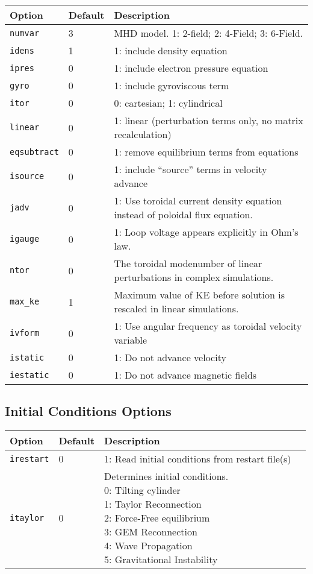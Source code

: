 \documentclass[letterpaper]{book}
\begin{document}
\begin{tabular}{llp{3in}}
  \textbf{Option}&\textbf{Default}&\textbf{Description}\\
  \hline
  \texttt{numvar} & 3   & MHD model. 1: 2-field;  2: 4-Field;  3: 6-Field.\\
  \texttt{idens}  & 1   & 1: include density equation\\
  \texttt{ipres}  & 0   & 1: include electron pressure equation\\
  \texttt{gyro}   & 0   & 1: include gyroviscous term\\
  \texttt{itor}   & 0   & 0: cartesian; 1: cylindrical\\
  \texttt{linear} & 0   & 1: linear (perturbation terms only, no matrix
                              recalculation)\\
  \texttt{eqsubtract}& 0& 1: remove equilibrium terms from equations\\
  \texttt{isource}   & 0& 1: include ``source'' terms in velocity
    advance\\
  \texttt{jadv}   & 0   & 1: Use toroidal current density equation
                          instead of poloidal flux equation.\\
  \texttt{igauge} & 0   & 1: Loop voltage appears explicitly in Ohm's law.\\
  \texttt{ntor}   & 0   & The toroidal modenumber of linear perturbations in
                          complex simulations.\\
  \texttt{max\_ke}& 1   & Maximum value of KE before solution is
                          rescaled in linear simulations.\\
  \texttt{ivform} & 0   & 1: Use angular frequency as toroidal velocity
                             variable\\
  \texttt{istatic}& 0   & 1: Do not advance velocity\\
  \texttt{iestatic}&0   & 1: Do not advance magnetic fields\\
\end{tabular}


\subsection{Initial Conditions Options}

\begin{tabular}{llll}
  \textbf{Option}&\textbf{Default}&\textbf{Description}\\
  \hline
  \texttt{irestart} & 0 & 1: Read initial conditions from restart file(s)\\
  \texttt{itaylor}  & 0 & \parbox[t]{2in}{Determines initial
  conditions.\\
  0: Tilting cylinder\\
  1: Taylor Reconnection\\
  2: Force-Free equilibrium\\
  3: GEM Reconnection\\
  4: Wave Propagation\\
  5: Gravitational Instability\\}
\end{tabular}
\end{document}
